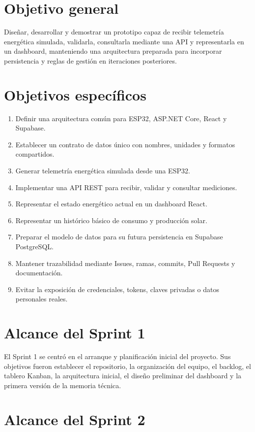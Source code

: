 \documentclass[11pt,a4paper,oneside]{report}
\begin{document}
\section{Objetivo general}

Diseñar, desarrollar y demostrar un prototipo capaz de recibir telemetría energética simulada, validarla, consultarla mediante una API y representarla en un dashboard, manteniendo una arquitectura preparada para incorporar persistencia y reglas de gestión en iteraciones posteriores.

\section{Objetivos específicos}

\begin{enumerate}
\item Definir una arquitectura común para ESP32, ASP.NET Core, React y Supabase.
\item Establecer un contrato de datos único con nombres, unidades y formatos compartidos.
\item Generar telemetría energética simulada desde una ESP32.
\item Implementar una API REST para recibir, validar y consultar mediciones.
\item Representar el estado energético actual en un dashboard React.
\item Representar un histórico básico de consumo y producción solar.
\item Preparar el modelo de datos para su futura persistencia en Supabase PostgreSQL.
\item Mantener trazabilidad mediante Issues, ramas, commits, Pull Requests y documentación.
\item Evitar la exposición de credenciales, tokens, claves privadas o datos personales reales.
\end{enumerate}

\section{Alcance del Sprint 1}

El Sprint 1 se centró en el arranque y planificación inicial del proyecto. Sus objetivos fueron establecer el repositorio, la organización del equipo, el backlog, el tablero Kanban, la arquitectura inicial, el diseño preliminar del dashboard y la primera versión de la memoria técnica.

\section{Alcance del Sprint 2}
\end{document}
